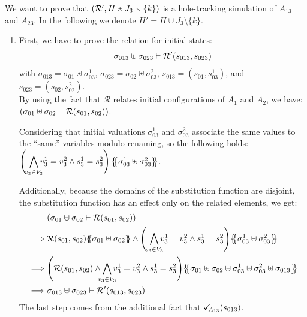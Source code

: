 \documentclass[runningheads]{llncs}
\begin{document}
We want to prove that ${\left(\mathcal{R}', H\uplus J_3 \smallsetminus\{k\}\right)}$ is a hole-tracking simulation of $A_{13}$ and $A_{23}$. In the following we denote $H'=H\cup J_3 \setminus\{k\}$.
\begin{enumerate}
\item First, we have to prove the relation for initial states:
\[\sigma_{013} \uplus \sigma_{023} \vdash \mathcal{R}'{\left(s_{013}, s_{023}\right)}\]
with $\sigma_{013} = \sigma_{01} \uplus \sigma_{03}^1$, $\sigma_{023} = \sigma_{02} \uplus \sigma_{03}^2$, $s_{013}=(s_{01},s_{03}^1)$, and $s_{023}=(s_{02},s_{02}^2)$.\\
By using the fact that $\mathcal{R}$ relates initial configurations of  $A_1$ and $A_2$, we have:
${\left(\sigma_{01} \uplus \sigma_{02} \vdash \mathcal{R}{\left(s_{01}, s_{02}\right)}\right)}$.  

Considering that initial valuations $\sigma_{03}^1$ and $\sigma_{03}^2$ associate the same values to the ``same'' variables modulo renaming, so the following holds:\\ $\left(\,\,{\displaystyle \bigwedge_\subbox{v_3\in V_3} v^1_3=v^2_3\wedge s^1_3 = s^2_3}\right)\psubst{\sigma_{03}^1 \uplus \sigma_{03}^2 }$.

Additionally, because  the domains of the substitution function are disjoint, the substitution function has an effect only on the related elements,  we get:
\begin{align*}
& \mpar{\sigma_{01} \uplus \sigma_{02} \vdash \mathcal{R}\mpar{s_{01}, s_{02}}} 
\\
\implies & \mathcal{R}\mpar{s_{01}, s_{02}}\psubst{ \sigma_{01} \uplus \sigma_{02}}  \land \mpar{\,\,\bigwedge_\subbox{v_3\in V_3} v^1_3=v^2_3\wedge s^1_3 = s^2_3}\psubst{\sigma_{03}^1 \uplus \sigma_{03}^2 }\\
\implies & \mpar{\mathcal{R}\mpar{s_{01}, s_{02}} \wedge  \bigwedge_\subbox{v_3\in V_3}  v^1_3=v^2_3\wedge s^1_3 = s^2_3} \psubst{ \sigma_{01} \uplus \sigma_{02} \uplus \sigma^1_{03}\uplus \sigma^2_{03}\uplus \sigma_{013} }\\
\implies & \sigma_{013} \uplus \sigma_{023} \vdash \mathcal{R}'\mpar{s_{013}, s_{023}}
\end{align*}
The last step comes from the additional fact that  $\checkmark_{\!\! A_{13}}(s_{013})$.


\end{enumerate}
\end{document}
